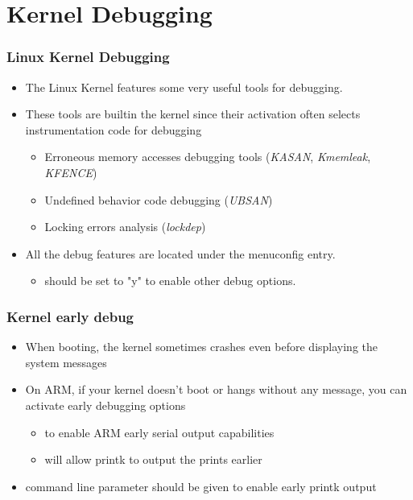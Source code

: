 \section{Kernel Debugging}

\begin{frame}
  \frametitle{Linux Kernel Debugging}
  \begin{itemize}
    \item The Linux Kernel features some very useful tools for debugging.
    \item These tools are builtin the kernel since their activation often
          selects instrumentation code for debugging
    \begin{itemize}
      \item Erroneous memory accesses debugging tools ({\em KASAN}, {\em Kmemleak}, {\em KFENCE})
      \item Undefined behavior code debugging ({\em UBSAN})
      \item Locking errors analysis ({\em lockdep})
    \end{itemize}
    \item All the debug features are located under the  menuconfig entry.
    \begin{itemize}
    \item {} should be set to "y" to enable other
          debug options.
    \end{itemize}
  \end{itemize}
\end{frame}



\begin{frame}
  \frametitle{Kernel early debug}
  \begin{itemize}
  \item When booting, the kernel sometimes crashes even before displaying
    the system messages
  \item On ARM, if your kernel doesn't boot or hangs without any
    message, you can activate early debugging options
  \begin{itemize}
    \item {} to enable ARM early serial output
      capabilities
    \item {} will allow printk to output the
      prints earlier
  \end{itemize}
  \item {} command line parameter should be given to enable
    early printk output
  \end{itemize}
\end{frame}

